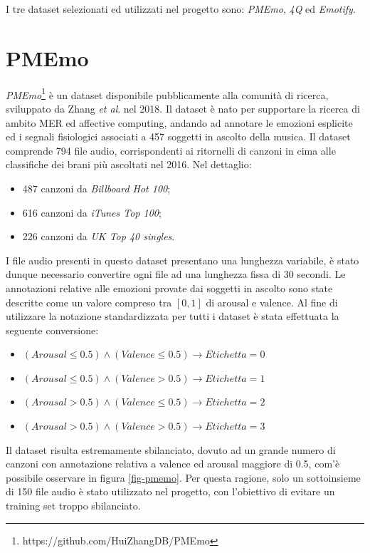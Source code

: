 \documentclass[11pt]{report}
\begin{document}
I tre dataset selezionati ed utilizzati nel progetto sono: \textit{PMEmo}\cite{zhang2018pmemo}, \textit{4Q}\cite{panda2018musical}\cite{panda2018novel} ed \textit{Emotify}\cite{aljanaki2014collecting}\cite{aljanaki2016studying}. 


\section{PMEmo}

\textit{PMEmo}\footnote{https://github.com/HuiZhangDB/PMEmo} è un dataset disponibile pubblicamente alla comunità di ricerca, sviluppato da Zhang \textit{et al}. nel 2018. Il dataset è nato per supportare la ricerca di ambito MER ed affective computing, andando ad annotare le emozioni esplicite ed i segnali fisiologici associati a 457 soggetti in ascolto della musica. Il dataset comprende 794 file audio, corrispondenti ai ritornelli di canzoni in cima alle classifiche dei brani più ascoltati nel 2016. Nel dettaglio:
\begin{itemize}
    \item 487 canzoni da \textit{Billboard Hot 100};     
    \item 616 canzoni da \textit{iTunes Top 100};
    \item 226 canzoni da \textit{UK Top 40 singles}.
\end{itemize}

I file audio presenti in questo dataset presentano una lunghezza variabile, è stato dunque necessario convertire ogni file ad una lunghezza fissa di 30 secondi. Le annotazioni relative alle emozioni provate dai soggetti in ascolto sono state descritte come un valore compreso tra $[0,1]$ di arousal e valence. Al fine di utilizzare la notazione standardizzata per tutti i dataset è stata effettuata la seguente conversione:

\begin{itemize}
    \item $(Arousal \le 0.5) \wedge (Valence \le 0.5) \to Etichetta = 0$
    \item $(Arousal \le 0.5) \wedge (Valence > 0.5) \to Etichetta = 1$
    \item $(Arousal > 0.5) \wedge (Valence \le 0.5) \to Etichetta = 2$
    \item $(Arousal > 0.5) \wedge (Valence > 0.5) \to Etichetta = 3$
\end{itemize}

Il dataset risulta estremamente sbilanciato, dovuto ad un grande numero di canzoni con annotazione relativa a valence ed arousal maggiore di 0.5, com'è possibile osservare in figura \ref{fig-pmemo}. Per questa ragione, solo un sottoinsieme di 150 file audio è stato utilizzato nel progetto, con l'obiettivo di evitare un training set troppo sbilanciato.
\end{document}
